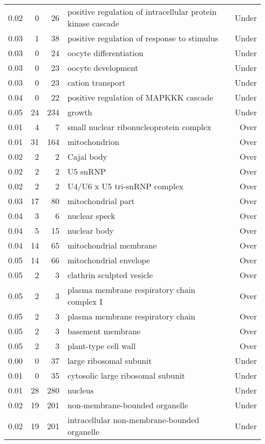\documentclass[10pt]{bmc_article}
\newenvironment{bmcformat}{\begin{raggedright}\baselineskip20pt\sloppy\setboolean{publ}{false}}{\end{raggedright}\baselineskip20pt\sloppy}
\begin{document}
\begin{bmcformat}
\begin{longtable}{rrrp{7cm}r}
  0.02 &   0 &  26 & positive regulation of intracellular protein kinase cascade & Under \\ 
  0.03 &   1 &  38 & positive regulation of response to stimulus & Under \\ 
  0.03 &   0 &  24 & oocyte differentiation & Under \\ 
  0.03 &   0 &  23 & oocyte development & Under \\ 
  0.03 &   0 &  23 & cation transport & Under \\ 
  0.04 &   0 &  22 & positive regulation of MAPKKK cascade & Under \\ 
  0.05 &  24 & 234 & growth & Under \\ 
   \hline
0.01 &   4 &   7 & small nuclear ribonucleoprotein complex & Over \\ 
  0.01 &  31 & 164 & mitochondrion & Over \\ 
  0.02 &   2 &   2 & Cajal body & Over \\ 
  0.02 &   2 &   2 & U5 snRNP & Over \\ 
  0.02 &   2 &   2 & U4/U6 x U5 tri-snRNP complex & Over \\ 
  0.03 &  17 &  80 & mitochondrial part & Over \\ 
  0.04 &   3 &   6 & nuclear speck & Over \\ 
  0.04 &   5 &  15 & nuclear body & Over \\ 
  0.04 &  14 &  65 & mitochondrial membrane & Over \\ 
  0.05 &  14 &  66 & mitochondrial envelope & Over \\ 
  0.05 &   2 &   3 & clathrin sculpted vesicle & Over \\ 
  0.05 &   2 &   3 & plasma membrane respiratory chain complex I & Over \\ 
  0.05 &   2 &   3 & plasma membrane respiratory chain & Over \\ 
  0.05 &   2 &   3 & basement membrane & Over \\ 
  0.05 &   2 &   3 & plant-type cell wall & Over \\ 
  0.00 &   0 &  37 & large ribosomal subunit & Under \\ 
  0.01 &   0 &  35 & cytosolic large ribosomal subunit & Under \\ 
  0.01 &  28 & 280 & nucleus & Under \\ 
  0.02 &  19 & 201 & non-membrane-bounded organelle & Under \\ 
  0.02 &  19 & 201 & intracellular non-membrane-bounded organelle & Under \\ 

\end{longtable}
\end{bmcformat}
\end{document}
